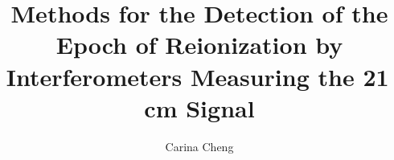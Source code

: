 \title{Methods for the Detection of the Epoch of Reionization by Interferometers Measuring the 21\,cm Signal}
\author{Carina Cheng} %
